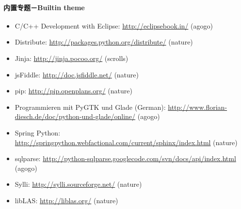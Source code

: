 \documentclass[letterpaper,10pt,english]{sphinxmanual}
\begin{document}
\paragraph{内置专题－Builtin theme}
\label{jupyter/sphinx_quickstart:_u5185_u7f6e_u4e13_u9898_uff0dBuiltin-theme}\begin{itemize}
\item {} 
C/C++ Development with Eclipse: \url{http://eclipsebook.in/} (agogo)

\item {} 
Distribute: \url{http://packages.python.org/distribute/} (nature)

\item {} 
Jinja: \url{http://jinja.pocoo.org/} (scrolls)

\item {} 
jsFiddle: \url{http://doc.jsfiddle.net/} (nature)

\item {} 
pip: \url{http://pip.openplans.org/} (nature)

\item {} 
Programmieren mit PyGTK und Glade (German):
\url{http://www.florian-diesch.de/doc/python-und-glade/online/} (agogo)

\item {} 
Spring Python:
\url{http://springpython.webfactional.com/current/sphinx/index.html}
(nature)

\item {} 
sqlparse:
\url{http://python-sqlparse.googlecode.com/svn/docs/api/index.html} (agogo)

\item {} 
Sylli: \url{http://sylli.sourceforge.net/} (nature)

\item {} 
libLAS: \url{http://liblas.org/} (nature)

\end{itemize}
\end{document}
